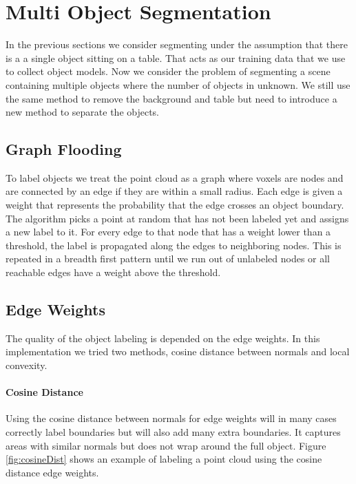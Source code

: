 \documentclass[conference]{IEEEtran}
\begin{document}
\section{Multi Object Segmentation}

In the previous sections we consider segmenting under the assumption that there is a a single object sitting on a table. That acts as our training data that we use to collect object models. Now we consider the problem of segmenting a scene containing multiple objects where the number of objects in unknown. We still use the same method to remove the background and table but need to introduce a new method to separate the objects. 

\subsection{Graph Flooding}

To label objects we treat the point cloud as a graph where voxels are nodes and are connected by an edge if they are within a small radius. Each edge is given a weight that represents the probability that the edge crosses an object boundary. The algorithm picks a point at random that has not been labeled yet and assigns a new label to it. For every edge to that node that has a weight lower than a threshold, the label is propagated along the edges to neighboring nodes. This is repeated in a breadth first pattern until we run out of unlabeled nodes or all reachable edges have a weight above the threshold.

\subsection{Edge Weights}

The quality of the object labeling is depended on the edge weights. In this implementation we tried two methods, cosine distance between normals and local convexity.

\paragraph{Cosine Distance}
\label{par:cosineDist}

Using the cosine distance between normals for edge weights will in many cases correctly label boundaries but will also add many extra boundaries. It captures areas with similar normals but does not wrap around the full object. Figure \ref{fig:cosineDist} shows an example of labeling a point cloud using the cosine distance edge weights.
\end{document}
